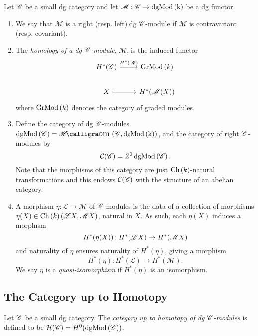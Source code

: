 \documentclass[dissertation.tex]{subfiles}
\begin{document}
\begin{defn}
  Let $\mathscr{C}$ be a small dg category and let $\mathscr{M} : \mathscr{C} \rightarrow \operatorname{dgMod\left(k\right)}$ be a dg functor.
  \begin{enumerate}
  \item
    We say that $\mathscr{M}$ is a right (resp. left) dg $\mathscr{C}$-module if $\mathscr{M}$ is contravariant (resp. covariant).
  \item
    The {\it homology of a dg $\mathscr{C}$-module}, $\mathscr{M}$, is the induced functor
    $$\begin{tikzcd}
      H^\ast(\CC) \arrow{r}{H^\ast(\mathscr{M})}& \Gr{k}\\
      X \arrow[mapsto]{r} & H^\ast(\mathscr{M}(X))
    \end{tikzcd}$$
    where $\operatorname{GrMod}\left(k\right)$ denotes the category of graded modules.
  \item
    Define the category of dg $\mathscr{C}$-modules $\cdg{\CC} = \SHom{\CC, \cdg{k}}$, and the category of right $\mathscr{C}$-modules by
    $$\mathcal{C}(\mathscr{C}) = Z^0 \operatorname{dgMod\left(\mathscr{C}\right)}.$$
    Note that the morphisms of this category are just $\operatorname{Ch}\left(k\right)$-natural transformations and this endows $\mathcal{C}(\mathscr{C})$ with the structure of an abelian category.
  \item
    A morphism $\eta \colon \mathscr{L} \rightarrow \mathscr{M}$ of $\mathscr{C}$-modules is the data of a collection of morphisms $\eta(X) \in \operatorname{Ch}\left(k\right)(\mathscr{L}X,\mathscr{M}X)$, natural in $X$.
    As such, each $\eta(X)$ induces a morphism
    $$H^\ast(\eta(X)) \colon H^\ast(\mathscr{L}X) \to H^\ast(\mathscr{M}X)$$
    and naturality of $\eta$ ensures naturality of $H^\ast(\eta)$, giving a morphism
    $$H^\ast(\eta) \colon H^\ast(\mathscr{L}) \rightarrow H^\ast(\mathscr{M}).$$
    We say $\eta$ is a {\it quasi-isomorphism} if $H^\ast(\eta)$ is an isomorphism.
  \end{enumerate}
\end{defn}

\subsection{The Category up to Homotopy}
\begin{defn}
  Let $\mathscr{C}$ be a small dg category.
  The {\it category up to homotopy of dg $\mathscr{C}$-modules} is defined to be $\mathcal{H}(\mathscr{C}) = H^0(\operatorname{dgMod\left(\mathscr{C}\right)})$.
\end{defn}
\end{document}
